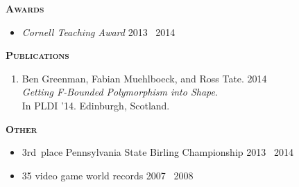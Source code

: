 \documentclass{article}
\newcommand{\mysection}[1]{\vspace{0.5cm}
\hspace{-1.3cm}\textsc{\textbf{#1}}~\hrulefill}
\begin{document}
\mysection{Awards} %
\begin{itemize}[topsep=-0.2cm,itemsep=0.1cm]
\item \emph{Cornell Teaching Award} \hfill 2013 \textendash\ 2014
\end{itemize}


\mysection{Publications}

\begin{enumerate}[topsep=-0.2cm,itemsep=0.1cm]
\item 
  Ben Greenman, Fabian Muehlboeck, and Ross Tate. \hfill 2014 \\
  \emph{Getting F-Bounded Polymorphism into Shape}. \\
  In PLDI '14.
  Edinburgh, Scotland.
\end{enumerate}

\mysection{Other}

\begin{itemize}[topsep=-0.2cm,itemsep=0.1cm]
\item 3rd~place Pennsylvania State Birling Championship \hfill 2013 \textendash\ 2014
\item 35 video game world records \hfill 2007 \textendash\ 2008
\end{itemize}
\end{document}
